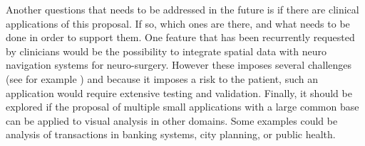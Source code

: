 Another questions that needs to be addressed in the future is if there are clinical applications of this proposal. If so, which ones are there, and what needs to be done in order to support them. One feature that has been recurrently requested by clinicians would be the possibility to integrate spatial data with neuro navigation systems for neuro-surgery. However these imposes several challenges (see for example \autocite{talos_diffusion_2003}) and because it imposes a  risk to the patient, such an application would require extensive testing and validation.
Finally, it should be explored if the proposal of multiple small applications with a large common base can be applied to visual analysis in other domains. Some examples could be analysis of transactions in banking systems, city planning, or public health.  